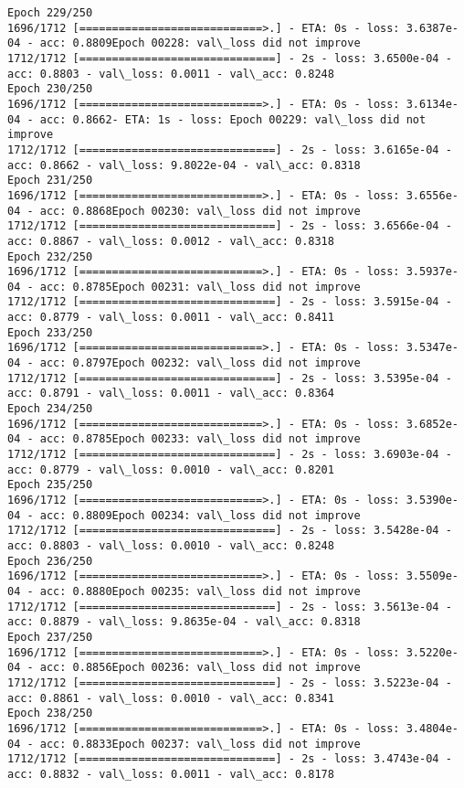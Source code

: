 \documentclass[11pt]{article}
\begin{document}
\begin{Verbatim}[commandchars=\\\{\}]
Epoch 229/250
1696/1712 [============================>.] - ETA: 0s - loss: 3.6387e-04 - acc: 0.8809Epoch 00228: val\_loss did not improve
1712/1712 [==============================] - 2s - loss: 3.6500e-04 - acc: 0.8803 - val\_loss: 0.0011 - val\_acc: 0.8248
Epoch 230/250
1696/1712 [============================>.] - ETA: 0s - loss: 3.6134e-04 - acc: 0.8662- ETA: 1s - loss: Epoch 00229: val\_loss did not improve
1712/1712 [==============================] - 2s - loss: 3.6165e-04 - acc: 0.8662 - val\_loss: 9.8022e-04 - val\_acc: 0.8318
Epoch 231/250
1696/1712 [============================>.] - ETA: 0s - loss: 3.6556e-04 - acc: 0.8868Epoch 00230: val\_loss did not improve
1712/1712 [==============================] - 2s - loss: 3.6566e-04 - acc: 0.8867 - val\_loss: 0.0012 - val\_acc: 0.8318
Epoch 232/250
1696/1712 [============================>.] - ETA: 0s - loss: 3.5937e-04 - acc: 0.8785Epoch 00231: val\_loss did not improve
1712/1712 [==============================] - 2s - loss: 3.5915e-04 - acc: 0.8779 - val\_loss: 0.0011 - val\_acc: 0.8411
Epoch 233/250
1696/1712 [============================>.] - ETA: 0s - loss: 3.5347e-04 - acc: 0.8797Epoch 00232: val\_loss did not improve
1712/1712 [==============================] - 2s - loss: 3.5395e-04 - acc: 0.8791 - val\_loss: 0.0011 - val\_acc: 0.8364
Epoch 234/250
1696/1712 [============================>.] - ETA: 0s - loss: 3.6852e-04 - acc: 0.8785Epoch 00233: val\_loss did not improve
1712/1712 [==============================] - 2s - loss: 3.6903e-04 - acc: 0.8779 - val\_loss: 0.0010 - val\_acc: 0.8201
Epoch 235/250
1696/1712 [============================>.] - ETA: 0s - loss: 3.5390e-04 - acc: 0.8809Epoch 00234: val\_loss did not improve
1712/1712 [==============================] - 2s - loss: 3.5428e-04 - acc: 0.8803 - val\_loss: 0.0010 - val\_acc: 0.8248
Epoch 236/250
1696/1712 [============================>.] - ETA: 0s - loss: 3.5509e-04 - acc: 0.8880Epoch 00235: val\_loss did not improve
1712/1712 [==============================] - 2s - loss: 3.5613e-04 - acc: 0.8879 - val\_loss: 9.8635e-04 - val\_acc: 0.8318
Epoch 237/250
1696/1712 [============================>.] - ETA: 0s - loss: 3.5220e-04 - acc: 0.8856Epoch 00236: val\_loss did not improve
1712/1712 [==============================] - 2s - loss: 3.5223e-04 - acc: 0.8861 - val\_loss: 0.0010 - val\_acc: 0.8341
Epoch 238/250
1696/1712 [============================>.] - ETA: 0s - loss: 3.4804e-04 - acc: 0.8833Epoch 00237: val\_loss did not improve
1712/1712 [==============================] - 2s - loss: 3.4743e-04 - acc: 0.8832 - val\_loss: 0.0011 - val\_acc: 0.8178

\end{Verbatim}
\end{document}
